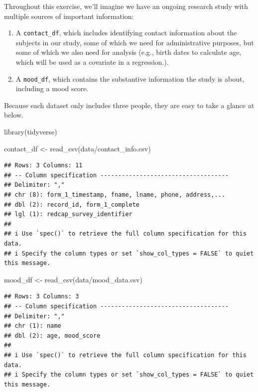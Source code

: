 \documentclass[
]{book}
\newenvironment{Shaded}{\begin{snugshade}}{\end{snugshade}}
\newcommand{\FunctionTok}[1]{\textcolor[rgb]{0.00,0.00,0.00}{#1}}
\newcommand{\NormalTok}[1]{#1}
\newcommand{\OtherTok}[1]{\textcolor[rgb]{0.56,0.35,0.01}{#1}}
\newcommand{\StringTok}[1]{\textcolor[rgb]{0.31,0.60,0.02}{#1}}
\begin{document}
Throughout this exercise, we'll imagine we have an ongoing research study with multiple sources of important information:

\begin{enumerate}
\def\labelenumi{\arabic{enumi}.}
\item
  A \texttt{contact\_df}, which includes identifying contact information about the subjects in our study, some of which we need for administrative purposes, but some of which we also need for analysis (e.g., birth dates to calculate age, which will be used as a covariate in a regression.).
\item
  A \texttt{mood\_df}, which contains the substantive information the study is about, including a mood score.
\end{enumerate}

Because each dataset only includes three people, they are easy to take a glance at below.

\begin{Shaded}
\begin{Highlighting}[]
\FunctionTok{library}\NormalTok{(tidyverse)}

\NormalTok{contact\_df }\OtherTok{\textless{}{-}} \FunctionTok{read\_csv}\NormalTok{(}\StringTok{\textquotesingle{}data/contact\_info.csv\textquotesingle{}}\NormalTok{)}
\end{Highlighting}
\end{Shaded}

\begin{verbatim}
## Rows: 3 Columns: 11
## -- Column specification ------------------------------------
## Delimiter: ","
## chr (8): form_1_timestamp, fname, lname, phone, address,...
## dbl (2): record_id, form_1_complete
## lgl (1): redcap_survey_identifier
## 
## i Use `spec()` to retrieve the full column specification for this data.
## i Specify the column types or set `show_col_types = FALSE` to quiet this message.
\end{verbatim}

\begin{Shaded}
\begin{Highlighting}[]
\NormalTok{mood\_df }\OtherTok{\textless{}{-}} \FunctionTok{read\_csv}\NormalTok{(}\StringTok{\textquotesingle{}data/mood\_data.csv\textquotesingle{}}\NormalTok{)}
\end{Highlighting}
\end{Shaded}

\begin{verbatim}
## Rows: 3 Columns: 3
## -- Column specification ------------------------------------
## Delimiter: ","
## chr (1): name
## dbl (2): age, mood_score
## 
## i Use `spec()` to retrieve the full column specification for this data.
## i Specify the column types or set `show_col_types = FALSE` to quiet this message.
\end{verbatim}
\end{document}
